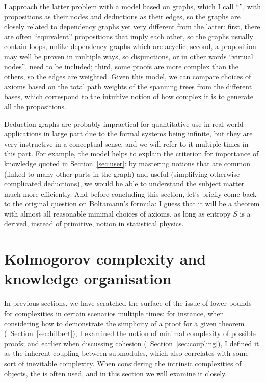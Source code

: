 I approach the latter problem with a model based on graphs, which I call
``'', with propositions as their nodes and deductions
as their edges, so the graphs are closely related to dependency graphs yet very
different from the latter: first, there are often ``equivalent'' propositions
that imply each other, so the graphs usually contain loops, unlike dependency
graphs which are acyclic; second, a proposition may well be proven in multiple
ways, so disjunctions, or in other words ``virtual nodes'', need to be included;
third, some proofs are more complex than the others, so the edges are weighted.
Given this model, we can compare choices of axioms based on the total path
weights of the spanning trees from the different bases, which correspond to
the intuitive notion of how complex it is to generate all the propositions.

Deduction graphs are probably impractical for quantitative use in real-world
applications in large part due to the formal systems being infinite, but they
are very instructive in a conceptual sense, and we will refer to it multiple
times in this part.  For example, the model helps to explain the criterion
for importance of knowledge quoted in Section~\ref{sec:user}: by mastering
notions that are common (linked to many other parts in the graph) and useful
(simplifying otherwise complicated deductions), we would be able to
understand the subject matter much more efficiently.  And before concluding
this section, let's briefly come back to the original question on Boltamann's
formula: I guess that it will be a theorem with almost all reasonable
minimal choices of axioms, as long as entropy $S$ is a derived,
instead of primitive, notion in statistical physics.

\section{Kolmogorov complexity and knowledge organisation}\label{sec:kolmogorov}

In previous sections, we have scratched the surface of the issue of lower
bounds for complexities in certain scenarios multiple times: for instance,
when considering how to demonstrate the simplicity of a proof for a given
theorem (\cf~Section~\ref{sec:hilbert}), I examined the notion of minimal
complexity of possible proofs; and earlier when discussing cohesion
(\cf~Section~\ref{sec:coupling}), I defined it as the inherent coupling
between submodules, which also correlates with some sort of inevitable
complexity.  When considering the intrinsic complexities of objects,
the  is
often used, and in this section we will examine it closely.

